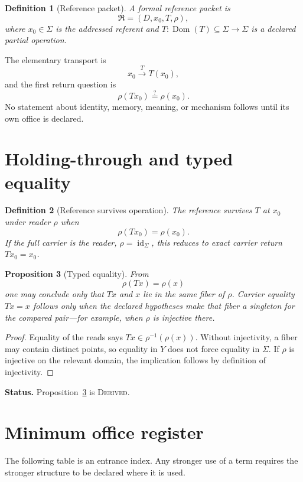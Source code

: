 \documentclass[11pt]{article}
\newtheorem{proposition}{Proposition}[section]
\newtheorem{definition}[proposition]{Definition}
\newcommand{\status}[1]{\textbf{Status.} #1}
\begin{document}
\begin{definition}[Reference packet]
A formal reference packet is
\[
\mathfrak R=(D,x_0,T,\rho),
\]
where \(x_0\in\Sigma\) is the addressed referent and \(T:\operatorname{Dom}(T)\subseteq\Sigma\to\Sigma\) is a declared partial operation.
\end{definition}

The elementary transport is
\[
x_0\xrightarrow{\,T\,}T(x_0),
\]
and the first return question is
\[
\rho(Tx_0)\stackrel{?}{=}\rho(x_0).
\]
No statement about identity, memory, meaning, or mechanism follows until its own office is declared.

\section{Holding-through and typed equality}
\begin{definition}[Reference survives operation]
The reference survives \(T\) at \(x_0\) under reader \(\rho\) when
\[
\rho(Tx_0)=\rho(x_0).
\]
If the full carrier is the reader, \(\rho=\operatorname{id}_\Sigma\), this reduces to exact carrier return \(Tx_0=x_0\).
\end{definition}

\begin{proposition}[Typed equality]\label{prop:typed-equality}
From
\[
\rho(Tx)=\rho(x)
\]
one may conclude only that \(Tx\) and \(x\) lie in the same fiber of \(\rho\). Carrier equality \(Tx=x\) follows only when the declared hypotheses make that fiber a singleton for the compared pair---for example, when \(\rho\) is injective there.
\end{proposition}
\begin{proof}
Equality of the reads says \(Tx\in\rho^{-1}(\rho(x))\). Without injectivity, a fiber may contain distinct points, so equality in \(Y\) does not force equality in \(\Sigma\). If \(\rho\) is injective on the relevant domain, the implication follows by definition of injectivity.
\end{proof}

\status{Proposition~\ref{prop:typed-equality} is \textsc{Derived}.}

\section{Minimum office register}
The following table is an entrance index. Any stronger use of a term requires the stronger structure to be declared where it is used.
\end{document}
